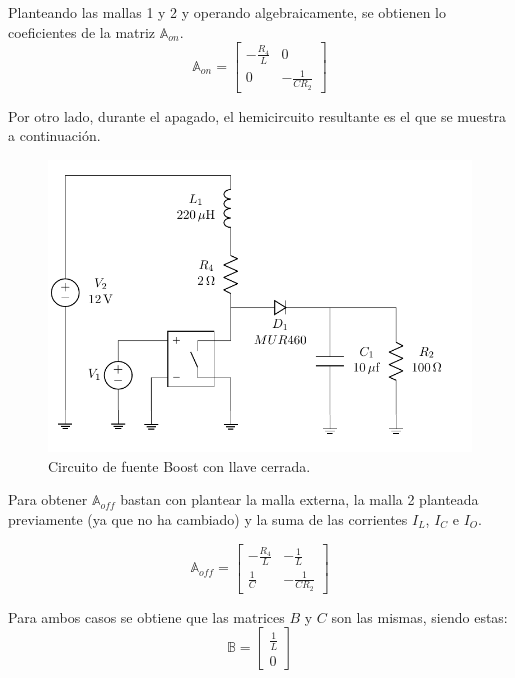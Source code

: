 Planteando las mallas 1 y 2 y operando algebraicamente, se obtienen lo coeficientes de la matriz $\mathbb{A}_{on}$.
\begin{equation}
\mathbb{A}_{on} =  \begin{bmatrix}
	-\frac{R_4}{L} & 0 \\
	0 & -\frac{1}{C R_2}
\end{bmatrix}
\end{equation}

Por otro lado, durante el apagado, el hemicircuito resultante es el que se muestra a continuación.

\begin{figure}[H]
	\centering
	\includegraphics[width=0.8\linewidth, page=3]{ImagenesEjercicio-2/CircuitsEj2}
	\caption{Circuito de fuente Boost con llave cerrada.}
	\label{fig:ej2:on}
\end{figure}

Para obtener $\mathbb{A}_{off}$ bastan con plantear la malla externa, la malla 2 planteada previamente (ya que no ha cambiado) y la suma de las corrientes $I_L$, $I_C$ e $I_O$.

\begin{equation}
\mathbb{A}_{off} =  \begin{bmatrix}
	-\frac{R_4}{L} & -\frac{1}{L} \\
	\frac{1}{C} & -\frac{1}{C R_2}
\end{bmatrix}
\end{equation}

Para ambos casos se obtiene que las matrices $B$ y $C$ son las mismas, siendo estas:
\begin{equation}
\mathbb{B} =  \begin{bmatrix}
	\frac{1}{L} \\
	0
\end{bmatrix}
\end{equation}

